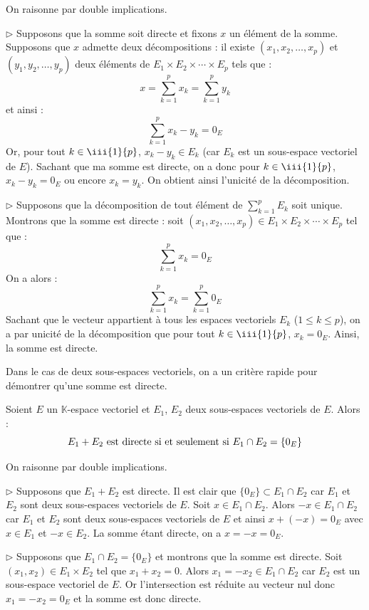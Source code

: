 \documentclass[french,11pt,twoside]{VcCours}
\newcommand{\Sum}[2]{\sum_{#1}^{#2}}
\begin{document}
\begin{Demonstration}{} On raisonne par double implications.



$\rhd$ Supposons que la somme soit directe et fixons $x$ un élément de la somme. Supposons que $x$ admette deux décompositions : il existe $(x_1, x_2, \ldots, x_p)$ et $(y_1, y_2, \ldots, y_p)$ deux éléments de $E_1 \times E_2 \times \cdots \times E_p$ tels que :
$$ x = \sum_{k=1}^p x_k  = \sum_{k=1}^p y_k$$
et ainsi :
$$ \sum_{k=1}^p x_k -y_k = 0_E $$
Or, pour tout $k \in \iii{1}{p}$, $x_k-y_k \in E_k$ (car $E_k$ est un sous-espace vectoriel de $E$). Sachant que ma somme est directe, on a donc pour $k \in \iii{1}{p}$, $x_k-y_k = 0_E$ ou encore $x_k=y_k$. On obtient ainsi l'unicité de la décomposition.

\medskip

$\rhd$ Supposons que la décomposition de tout élément de $\Sum{k=1}{p} E_k$ soit unique. Montrons que la somme est directe : soit $(x_1, x_2, \ldots, x_p) \in E_1 \times E_2 \times \cdots \times E_p$ tel que :
$$ \sum_{k=1}^p x_k = 0_E $$
On a alors :
$$ \sum_{k=1}^p x_k = \sum_{k=1}^p 0_E$$
Sachant que le vecteur appartient à tous les espaces vectoriels $E_k$ ($1 \leq k \leq p$), on a par unicité de la décomposition que pour tout $k \in \iii{1}{p}$, $x_k=0_E$. Ainsi, la somme est directe.
\end{Demonstration}
 
 Dans le cas de deux sous-espaces vectoriels, on a un critère rapide pour démontrer qu'une somme est directe.
 
 \begin{Proposition}{}\label{SommeDir2}
 Soient $E$ un $\mathbb{K}$-espace vectoriel et $E_1$, $E_2$ deux sous-espaces vectoriels de $E$. Alors :
 $$ E_1 + E_2 \hbox{ est directe si et seulement si }{ E_1 \cap E_2 = \lbrace 0_E \rbrace} $$
 \end{Proposition}
 
 \begin{Demonstration}{} On raisonne par double implications.

$\rhd$ Supposons que $E_1 + E_2$ est directe. Il est clair que  $\lbrace 0_E \rbrace \subset E_1 \cap E_2$ car $E_1$ et $E_2$ sont deux sous-espaces vectoriels de $E$. Soit $x \in E_1 \cap E_2$. Alors $-x \in E_1 \cap E_2$ car $E_1$ et $E_2$ sont deux sous-espaces vectoriels de $E$ et ainsi $x+(-x) = 0_E$ avec $x \in E_1$ et $-x \in E_2$. La somme étant directe, on a $x=-x=0_E$.

\medskip

$\rhd$  Supposons que $E_1 \cap E_2 = \lbrace 0_E \rbrace$ et montrons que la somme est directe. Soit $(x_1,x_2) \in E_1 \times E_2$ tel que $x_1+x_2 = 0$. Alors $x_1=-x_2 \in E_1 \cap E_2$ car $E_2$ est un sous-espace vectoriel de $E$. Or l'intersection est réduite au vecteur nul donc $x_1=-x_2 = 0_E$ et la somme est donc directe.
\end{Demonstration}
\end{document}
